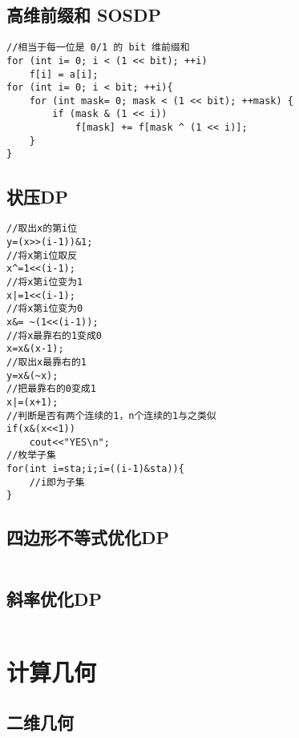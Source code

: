 \documentclass[twocolumn,a4]{article}
\begin{document}
\subsection{高维前缀和 SOSDP}
\begin{lstlisting}
//相当于每一位是 0/1 的 bit 维前缀和
for (int i= 0; i < (1 << bit); ++i)
    f[i] = a[i];
for (int i= 0; i < bit; ++i){
	for (int mask= 0; mask < (1 << bit); ++mask) {
        if (mask & (1 << i))
            f[mask] += f[mask ^ (1 << i)];
    }
}
\end{lstlisting}

\subsection{状压DP}
\begin{lstlisting}
//取出x的第i位
y=(x>>(i-1))&1;
//将x第i位取反
x^=1<<(i-1);
//将x第i位变为1
x|=1<<(i-1);
//将x第i位变为0
x&= ~(1<<(i-1));
//将x最靠右的1变成0
x=x&(x-1);
//取出x最靠右的1
y=x&(~x);
//把最靠右的0变成1
x|=(x+1);
//判断是否有两个连续的1，n个连续的1与之类似
if(x&(x<<1))
    cout<<"YES\n";
//枚举子集
for(int i=sta;i;i=((i-1)&sta)){
    //i即为子集
}
\end{lstlisting}

\subsection{四边形不等式优化DP}
\begin{lstlisting}

\end{lstlisting}

\subsection{斜率优化DP}
\begin{lstlisting}

\end{lstlisting}

\section{计算几何}

\subsection{二维几何}
\begin{lstlisting}

\end{lstlisting}
\end{document}
